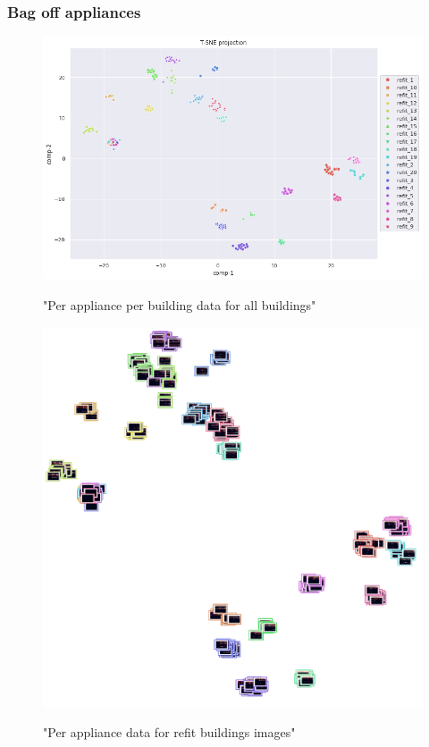 \subsubsection{Bag off appliances}

\begin{figure}[H]
	\centering
	\caption{"Per appliance per building data for all buildings"}
	\includegraphics[width=.8\textwidth]{Figures/TSNE/TSNE_BOA/refit/scatter_refit_all.png}
	\label{fig:tsne_boa_scatter_refit8}
\end{figure}

\begin{figure}[H]
	\centering
	\caption{"Per appliance data for refit buildings images"}
	\includegraphics[width=.9\textwidth]{Figures/TSNE/TSNE_BOA/refit/img_scatter_refitall.png}
	\label{fig:tsne_boa_img_scatter_refit8}
\end{figure}
